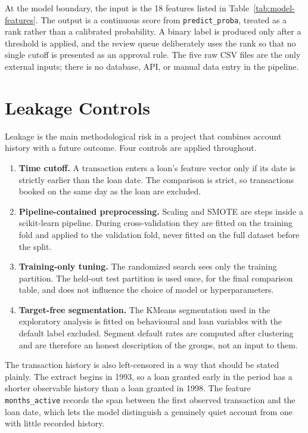 At the model boundary, the input is the 18 features listed in Table~\ref{tab:model-features}. The output is a continuous score from \texttt{predict\_proba}, treated as a rank rather than a calibrated probability. A binary label is produced only after a threshold is applied, and the review queue deliberately uses the rank so that no single cutoff is presented as an approval rule. The five raw CSV files are the only external inputs; there is no database, API, or manual data entry in the pipeline.

\section{Leakage Controls}
\label{sec:leakage-controls}

Leakage is the main methodological risk in a project that combines account history with a future outcome. Four controls are applied throughout.

\begin{enumerate}
    \item \textbf{Time cutoff.} A transaction enters a loan's feature vector only if its date is strictly earlier than the loan date. The comparison is strict, so transactions booked on the same day as the loan are excluded.
    \item \textbf{Pipeline-contained preprocessing.} Scaling and SMOTE are steps inside a scikit-learn pipeline. During cross-validation they are fitted on the training fold and applied to the validation fold, never fitted on the full dataset before the split.
    \item \textbf{Training-only tuning.} The randomized search sees only the training partition. The held-out test partition is used once, for the final comparison table, and does not influence the choice of model or hyperparameters.
    \item \textbf{Target-free segmentation.} The KMeans segmentation used in the exploratory analysis is fitted on behavioural and loan variables with the default label excluded. Segment default rates are computed after clustering and are therefore an honest description of the groups, not an input to them.
\end{enumerate}

The transaction history is also left-censored in a way that should be stated plainly. The extract begins in 1993, so a loan granted early in the period has a shorter observable history than a loan granted in 1998. The feature \texttt{months\_active} records the span between the first observed transaction and the loan date, which lets the model distinguish a genuinely quiet account from one with little recorded history.

